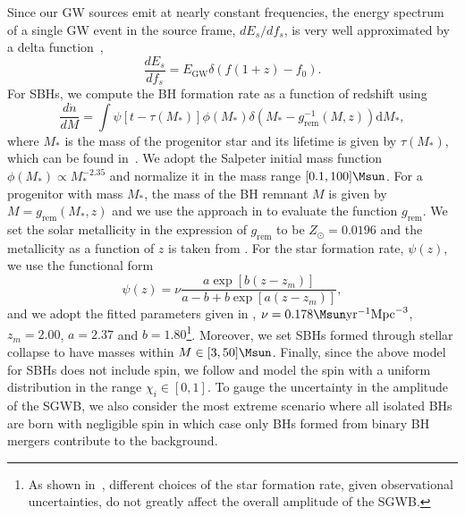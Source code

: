 \documentclass[
reprint,           %
superscriptaddress,%
amsmath,           %
amssymb,           %
aps,               %
prd,               %
notitlepage,       %
floatfix,          %
nofootinbib %
]{revtex4-1}
\def\e{\begin{equation}}
\def\q{\end{equation}}
\begin{document}
Since our GW sources emit at nearly constant frequencies, the energy spectrum of a single GW event in the source frame, $d E_s/d f_s$, is very well approximated by a delta function~\cite{Brito:2017wnc,Tsukada:2018mbp,Tsukada:2020lgt},
\e
\frac{d E_{s}}{d f_{s}} = E_{\mathrm{GW}} \delta\left(f(1+z)-f_{0}\right).
\q
For SBHs, we compute the BH formation rate as a function of redshift using~\cite{Brito:2017wnc,Tsukada:2018mbp,Tsukada:2020lgt}
\e\label{ndot}
\frac{d \dot{n}}{d M}= \int \psi[t-\tau(M_*)]\phi(M_*)\delta(M_*-g^{-1}_{\mathrm{rem}}(M,z))\mathrm{d}M_*,
\q
where $M_*$ is the mass of the progenitor star and its lifetime is given by $\tau(M_*)$, which can be found in~\cite{Schaerer:2001jc}. We adopt the Salpeter initial mass function $\phi(M_*)\propto M_*^{-2.35}$ \cite{Salpeter:1955it} and normalize it in the mass range $[0.1,100]\Msun$. For a progenitor with mass $M_*$, the mass of the BH remnant $M$ is given by $M=g_{\mathrm{rem}}(M_*,z)$ and we use the approach in \cite{Fryer:2011cx} to evaluate the function $g_{\mathrm{rem}}$. We set the solar metallicity in the expression of $g_{\mathrm{rem}}$ to be $Z_\odot=0.0196$ \cite{Vagnozzi:2017wge} and the metallicity as a function of $z$ is taken from \cite{Belczynski:2016obo}. For the star formation rate, $\psi(z)$, we use the functional form \cite{Springel:2002ux}
\e
\psi(z)=\nu\frac{a\exp[b(z-z_m)]}{a-b+b\exp[a(z-z_m)]},
\q
and we adopt the fitted parameters given in \cite{Vangioni:2014axa}, $\nu=0.178\Msun \mathrm{yr}^{-1}\mathrm{Mpc}^{-3}$, $z_m=2.00$, $a=2.37$ and $b=1.80$\footnote{As shown in~\cite{Tsukada:2020lgt}, different choices of the star formation rate, given observational uncertainties, do not greatly affect the overall amplitude of the SGWB.}. Moreover, we set SBHs formed through stellar collapse to have masses within $M\in[3,50]\Msun$. Finally, since the above model for SBHs does not include spin, we follow \cite{Brito:2017zvb,Brito:2017wnc,Tsukada:2018mbp,Tsukada:2020lgt} and model the spin with a uniform distribution in the range $\chi_i\in[0,1]$. To gauge the uncertainty in the amplitude of the SGWB,  we also consider the most extreme scenario where all isolated BHs are born with negligible spin in which case only BHs formed from binary BH mergers contribute to the background.

\end{document}
